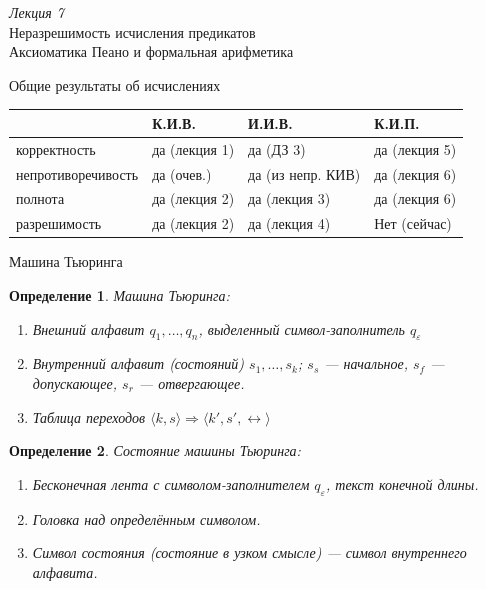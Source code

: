 \documentclass[aspectratio=169]{beamer}
\newtheorem{dfn}{Определение}[section]
\begin{document}
\begin{frame}
\begin{center}\Large {\it Лекция 7}\\\vspace{0.5cm}
Неразрешимость исчисления предикатов\\
Аксиоматика Пеано и формальная арифметика
\end{center}
\end{frame}

\begin{frame}{Общие результаты об исчислениях}
\begin{tabular}{llll}
      & К.И.В. & И.И.В. & К.И.П.\\\hline
корректность & да (лекция 1) & да (ДЗ 3) & да (лекция 5)\\
непротиворечивость & да (очев.) & да (из непр. КИВ) & да (лекция 6)\\
полнота & да (лекция 2) & да (лекция 3) & да (лекция 6)\\
разрешимость & да (лекция 2) & да (лекция 4) & \pause\color{red}Нет (сейчас)
\end{tabular}
\end{frame}

\begin{frame}{Машина Тьюринга}
\begin{dfn}Машина Тьюринга:
\begin{enumerate}
\item Внешний алфавит $q_1, \dots, q_n$, выделенный символ-заполнитель $q_\varepsilon$
\item Внутренний алфавит (состояний) $s_1, \dots, s_k$; $s_s$ --- начальное, $s_f$ --- допускающее, $s_r$ --- отвергающее.
\item Таблица переходов $\langle k, s \rangle \Rightarrow \langle k', s', \leftrightarrow \rangle$
\end{enumerate}
\end{dfn}

\begin{dfn}Состояние машины Тьюринга:
\begin{enumerate}
\item Бесконечная лента с символом-заполнителем $q_\varepsilon$, текст конечной длины.
\item Головка над определённым символом.
\item Символ состояния (состояние в узком смысле) --- символ внутреннего алфавита.
\end{enumerate}
\end{dfn}
\end{frame}
\end{document}
